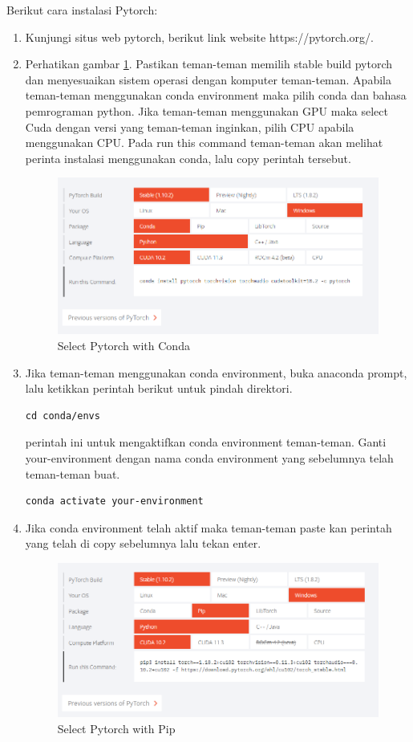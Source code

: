Berikut cara instalasi Pytorch:
\begin{enumerate}
\item Kunjungi situs web pytorch, berikut link website https://pytorch.org/.
\item Perhatikan gambar \ref{pytorch1}. Pastikan teman-teman memilih stable build pytorch dan menyesuaikan sistem operasi dengan komputer teman-teman. Apabila teman-teman menggunakan conda environment maka pilih conda dan bahasa pemrograman python. Jika teman-teman menggunakan GPU maka select Cuda dengan versi yang teman-teman inginkan, pilih CPU apabila menggunakan CPU. Pada run this command teman-teman akan melihat perinta instalasi menggunakan conda, lalu copy perintah tersebut.
\begin{figure}[H]
\centering
\includegraphics[scale=.35]{figures/pytorch1}
\caption{Select Pytorch with Conda}
\label{pytorch1}
\end{figure}

\item Jika teman-teman menggunakan conda environment, buka anaconda prompt, lalu ketikkan perintah berikut untuk pindah direktori.
\begin{verbatim}
cd conda/envs
\end{verbatim}
perintah ini untuk mengaktifkan conda environment teman-teman. Ganti your-environment dengan nama conda environment yang sebelumnya telah teman-teman buat.
\begin{verbatim}
conda activate your-environment
\end{verbatim}

\item Jika conda environment telah aktif maka teman-teman paste kan perintah yang telah di copy sebelumnya lalu tekan enter.
\begin{figure}[H]
\centering
\includegraphics[scale=.35]{figures/pytorch2}
\caption{Select Pytorch with Pip}
\label{pytorch2}
\end{figure}


\end{enumerate}
